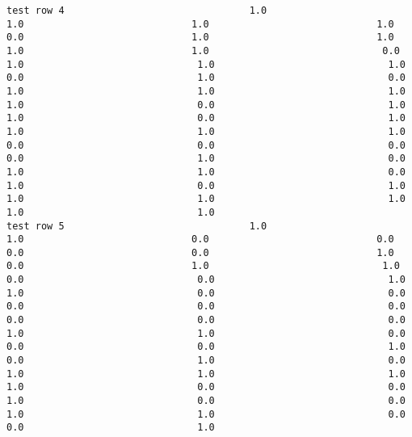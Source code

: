 \documentclass[11pt]{article}
\begin{document}
\begin{verbatim}
test row 4                                1.0                             1.0                             1.0                             1.0                             0.0                             1.0                             1.0                             1.0                             1.0                              0.0                              1.0                              1.0                              1.0                              0.0                              1.0                              0.0                              1.0                              1.0                              1.0                              1.0                              0.0                              1.0                              1.0                              0.0                              1.0                              1.0                              1.0                              1.0                              0.0                              0.0                              0.0                              0.0                              1.0                              0.0                              1.0                              1.0                              0.0                              1.0                              0.0                              1.0                              1.0                              1.0                              1.0                              1.0                              1.0
test row 5                                1.0                             1.0                             0.0                             0.0                             0.0                             0.0                             1.0                             0.0                             1.0                              1.0                              0.0                              0.0                              1.0                              1.0                              0.0                              0.0                              0.0                              0.0                              0.0                              0.0                              0.0                              0.0                              1.0                              1.0                              0.0                              0.0                              0.0                              1.0                              0.0                              1.0                              0.0                              1.0                              1.0                              1.0                              1.0                              0.0                              0.0                              1.0                              0.0                              0.0                              1.0                              1.0                              0.0                              0.0                              1.0

\end{verbatim}
\end{document}
